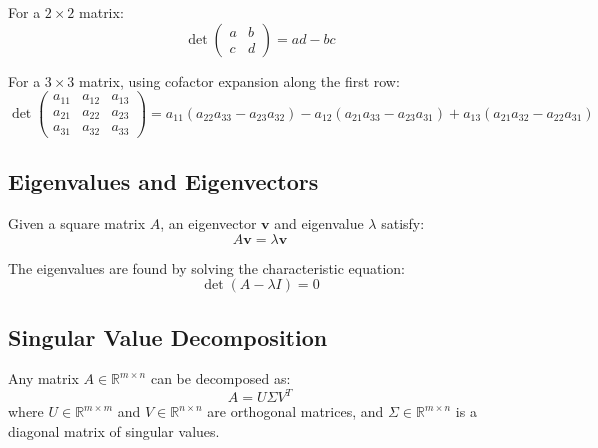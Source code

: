 \documentclass[11pt]{article}
\begin{document}
For a $2 \times 2$ matrix:
\begin{equation}
  \det \begin{pmatrix} a & b \\ c & d \end{pmatrix} = ad - bc
\end{equation}

For a $3 \times 3$ matrix, using cofactor expansion along the first row:
\begin{equation}
  \det \begin{pmatrix}
    a_{11} & a_{12} & a_{13} \\
    a_{21} & a_{22} & a_{23} \\
    a_{31} & a_{32} & a_{33}
  \end{pmatrix}
  = a_{11}(a_{22}a_{33} - a_{23}a_{32})
  - a_{12}(a_{21}a_{33} - a_{23}a_{31})
  + a_{13}(a_{21}a_{32} - a_{22}a_{31})
\end{equation}

\subsection{Eigenvalues and Eigenvectors}

Given a square matrix $A$, an eigenvector $\mathbf{v}$ and eigenvalue $\lambda$ satisfy:
\begin{equation}
  A\mathbf{v} = \lambda\mathbf{v}
  \label{eq:eigen}
\end{equation}

The eigenvalues are found by solving the characteristic equation:
\begin{equation}
  \det(A - \lambda I) = 0
  \label{eq:characteristic}
\end{equation}

\subsection{Singular Value Decomposition}

Any matrix $A \in \mathbb{R}^{m \times n}$ can be decomposed as:
\begin{equation}
  A = U \Sigma V^T
  \label{eq:svd}
\end{equation}
where $U \in \mathbb{R}^{m \times m}$ and $V \in \mathbb{R}^{n \times n}$ are orthogonal matrices,
and $\Sigma \in \mathbb{R}^{m \times n}$ is a diagonal matrix of singular values.

\lipsum[4-5]

\newpage

\end{document}

